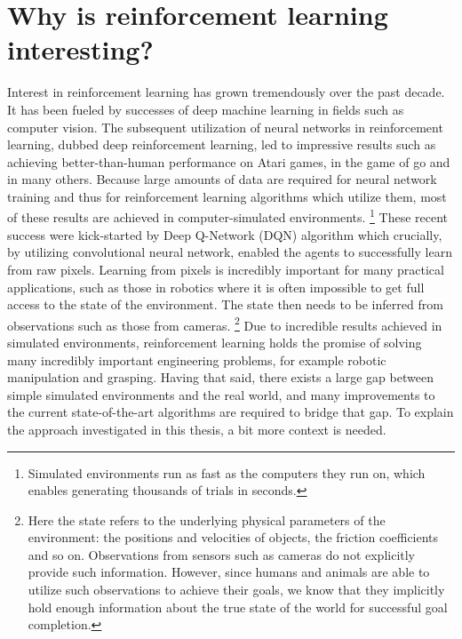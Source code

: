 \section{Why is reinforcement learning interesting?}
\label{sec-why-is-rl-interesting}
Interest in reinforcement learning has grown tremendously over the past decade.
It has been fueled by successes of deep machine learning in fields such as computer vision.
The subsequent utilization of neural networks in reinforcement learning,
dubbed deep reinforcement learning,
led to impressive results such as achieving better-than-human
performance on Atari games, in the game of go and in many others.
Because large amounts of data are required for neural network training
and thus for reinforcement learning algorithms which utilize them,
most of these results are achieved in computer-simulated environments.
\footnote{Simulated environments run as fast as the computers they run on,
		which enables generating thousands of trials in seconds.}
These recent success were kick-started by Deep Q-Network (DQN) algorithm \cite{mnih2013atari} which crucially,
by utilizing convolutional neural network, enabled the agents to successfully learn from raw pixels.
Learning from pixels is incredibly important for many practical applications,
such as those in robotics
where it is often impossible to get full access to the state of the environment.
The state then needs to be inferred from observations such as those from cameras.
\footnote{Here the state refers to the underlying physical parameters of the environment:
the positions and velocities of objects, the friction coefficients and so on.
Observations from sensors such as cameras do not explicitly provide such information.
However, since humans and animals are able to utilize such observations to achieve their
goals, we know that they implicitly hold enough information about the true state
of the world for successful goal completion.}
Due to incredible results achieved in simulated environments,
reinforcement learning holds the promise of solving
many incredibly important engineering problems, for example robotic manipulation
and grasping.
Having that said, there exists a large gap between simple simulated environments and
the real world,
and many improvements to the current state-of-the-art algorithms are required to
bridge that gap.
To explain the approach investigated in this thesis,
a bit more context is needed.

